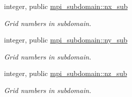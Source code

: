 \begin{DoxyCompactItemize}
\item 
integer, public \mbox{\hyperlink{namespacempi__subdomain_a005fe127fe0fc85b932814a820a36444}{mpi\+\_\+subdomain\+::nx\+\_\+sub}}
\begin{DoxyCompactList}\small\item\em Grid numbers in subdomain. \end{DoxyCompactList}\item 
integer, public \mbox{\hyperlink{namespacempi__subdomain_a665ba05d0ae9309dd28b9b513a0c87a1}{mpi\+\_\+subdomain\+::ny\+\_\+sub}}
\begin{DoxyCompactList}\small\item\em Grid numbers in subdomain. \end{DoxyCompactList}\item 
integer, public \mbox{\hyperlink{namespacempi__subdomain_a07555cc931ac78376a4c81207662251f}{mpi\+\_\+subdomain\+::nz\+\_\+sub}}
\begin{DoxyCompactList}\small\item\em Grid numbers in subdomain. \end{DoxyCompactList}\end{DoxyCompactItemize}

